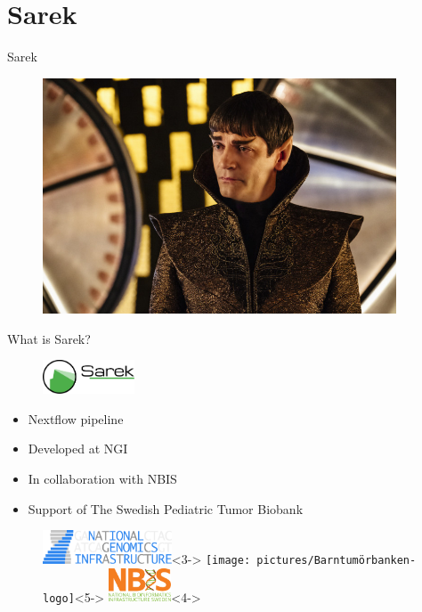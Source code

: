 \documentclass{beamer}
\begin{document}
\section{Sarek}

\begin{frame}{Sarek}
	\begin{figure}
		\includegraphics[height=7cm]{pictures/Sarek_discovery.jpg}
	\end{figure}
\end{frame}

\begin{frame}{What is Sarek?}
	\vfill
	\begin{figure}
		\includegraphics[height=1cm]{pictures/Sarek_no_border}
	\end{figure}
	\begin{itemize}
		\pause
		\item Nextflow pipeline
		\item<3-> Developed at NGI
		\item<4-> In collaboration with NBIS
		\item<5-> Support of The Swedish Pediatric Tumor Biobank
	\end{itemize}
	\begin{figure}
		\includegraphics[height=1cm]{pictures/NGI}<3->
		\only<3->{\hfill}
		\texttt{[image: pictures/Barntumörbanken-logo]}<5->
		\only<4->{\hfill}
		\includegraphics[height=1cm]{pictures/NBIS}<4->
	\end{figure}
	\vfill
\end{frame}
\end{document}
